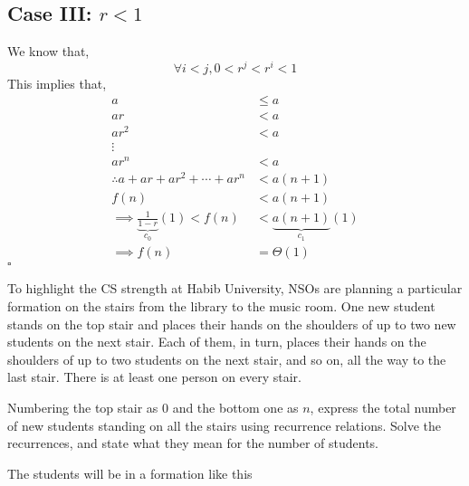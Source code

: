\documentclass[addpoints]{exam}
\begin{document}
\begin{questions}
\begin{solution}
		\subsection*{Case III: \(r < 1\)}
		We know that,
		\[\forall i < j, 0 < r^j < r^i < 1\]
		This implies that,
		\begin{equation}
			\begin{aligned}
				a                                                   & \leq a                         \\
				ar                                                  & < a                            \\
				ar^2                                                & < a                            \\
				\vdots                                                                               \\
				ar^n                                                & < a                            \\
				\hline
				\therefore a+ar+ar^2+\cdots+ar^n                    & < a(n+1)                       \\
				f(n)                                                & < a(n+1)                       \\
				\implies \underbrace{\frac{1}{1-r}}_{c_0}(1) < f(n) & < \underbrace{a(n+1)}_{c_1}(1) \\
				\implies f(n)                                       & = \Theta(1)
			\end{aligned}
		\end{equation}
		\hfill\(\square\)
	\end{solution}

	\question[5] To highlight the CS strength at Habib University, NSOs are planning a particular formation on the stairs from the library to the music room. One new student stands on the top stair and places their hands on the shoulders of up to two new students on the next stair. Each of them, in turn, places their hands on the shoulders of up to two students on the next stair, and so on, all the way to the last stair. There is at least one person on every stair.

	Numbering the top stair as $0$ and the bottom one as $n$, express the total number of new students standing on all the stairs using recurrence relations. Solve the recurrences, and state what they mean for the number of students.

	\begin{solution}
		The students will be in a formation like this
		\begin{center}
		\end{center}


\end{solution}
\end{questions}
\end{document}
